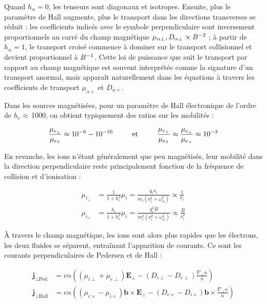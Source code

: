 \begin{refsection}
Quand $h_\alpha=0$, les tenseurs sont diagonaux et isotropes. Ensuite, plus le
paramètre de Hall augmente, plus le transport dans les directions transverses se
réduit :
les coefficients indicés avec le symbole perpendiculaire sont inversement
proportionnels au carré du champ magnétique $\mu_{\alpha\perp},
D_{\alpha\perp}\propto B^{{-2}}$ ; à partir de $h_\alpha=1$, le
transport croisé commence à dominer sur le transport collisionnel et devient proportionnel à
$B^{{-1}}$. Cette loi de puissance que suit le transport par rapport au
champ magnétique est souvent interprétée comme la signature d'un transport
anormal, mais apparaît naturellement dans les équations à travers les
coefficients de transport $\mu_{\alpha\times}$ et $D_{\alpha\times}$.

Dans les sources magnétisées, pour un paramètre de Hall électronique de l'ordre
de $h_e\approx\,$1000, on obtient typiquement des ratios sur les mobilités :

\begin{equation}
\frac{\mu_{e_\perp}}{\mu_{e_\para}}\approx
10^{-6}-10^{-10}\text{~~~~~~~~et~~~~~~~~}\frac{\mu_{e_\times}}{\mu_{e_\para}}\approx
\frac{\mu_{e_\perp}}{\mu_{e_\times}}\approx10^{-3}
\end{equation}

En revanche, les ions n'étant généralement que peu magnétisés, leur mobilité
dans la direction perpendiculaire reste principalement fonction de la fréquence
de collision et d'ionisation  :

\begin{align}
\mu_{i_\perp}&=\frac{1}{1+h_i^2}\mu_i=\frac{q_i\nu_i}{m_i(\nu_i^2+\omega_{ci}^2)}\propto\frac{1}{\nu_i}\\
\mu_{i_\times}&=\frac{h_i}{1+h_i^2}\mu_i=\frac{q_i^2B}{m_i^2(\nu_i^2+\omega_{ci}^2)}\propto\frac{B}{\nu_i^2}
\end{align}

À travers le champ magnétique, les ions sont alors plus rapides que les
électrons, les deux fluides se séparent, entraînant l'apparition de
courants. Ce sont les courants perpendiculaires de Pedersen et de Hall :

\begin{align}
\mathbf j_{\perp\text{Ped}}&=en\left((\mu_{i\perp}+\mu_{e\perp})\mathbf E_\perp
- (D_{i\perp}-D_{e\perp})\frac{\nabla_\perp n}{n}\right)\\
\mathbf j_{\perp\text{Hall}}&=en\left((\mu_{e\times}-\mu_{i\times})\mathbf
b\times\mathbf E_\perp - (D_{e\times}-D_{i\times})\mathbf
b\times\frac{\nabla_\perp n}{n}\right)
\end{align}


\end{refsection}
